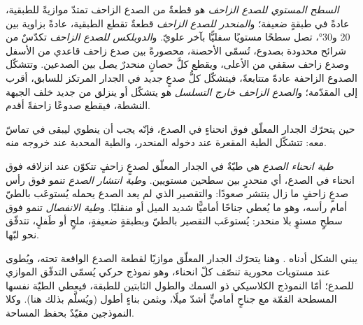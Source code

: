 \begin{definition}\label{def:b3:orogenic-wedges:thrust-geometry}
\emph{السطح المستوي للصدع الزاحف} هو قطعةٌ من الصدع الزاحف تمتدّ
موازيةً للطبقية، عادةً في طبقةٍ ضعيفة؛ و\emph{المنحدر
للصدع الزاحف} قطعةٌ تقطع الطبقية،
عادةً بزاوية بين 20 و\ang{30}، تصل سطحًا مستويًا سفليًّا بآخر علويّ.
و\emph{الدوبلكس للصدع الزاحف} تكدّسٌ من شرائح محدودة بصدوع،
تُسمّى الأحصنة، محصورةً بين صدع زاحف قاعدي من الأسفل وصدع زاحف سقفي
من الأعلى، ويقطع كلَّ حصانٍ منحدرٌ يصل بين الصدعين. وتتشكّل الصدوع الزاحفة عادةً
متتابعةً، فيتشكّل كلُّ صدعٍ جديد في الجدار المرتكز للسابق، أقرب إلى
المقدّمة؛ و\emph{الصدع الزاحف خارج التسلسل} هو
يتشكّل أو ينزلق من جديد خلف الجبهة النشطة، فيقطع صدوعًا زاحفةً أقدم.
\end{definition}

حين يتحرّك الجدار المعلّق فوق انحناءٍ في الصدع، فإنّه يجب أن ينطوي ليبقى في
تماسّ معه: تتشكّل الطية المقعرة عند دخوله المنحدر، والطية المحدبة
عند خروجه منه.

\begin{definition}\label{def:b3:orogenic-wedges:thrust-folds}
\emph{طية انحناء الصدع} هي طيّةٌ في الجدار المعلّق
لصدعٍ زاحفٍ تتكوّن عند انزلاقه فوق انحناء في الصدع، أي منحدرٍ بين
سطحين مستويين. و\emph{طية انتشار الصدع}
تنمو فوق رأس صدعٍ زاحفٍ ما زال ينتشر صعودًا: والتقصير الذي لم يعد الصدع
يحمله يُستوعَب بالطيّ أمام رأسه، وهو ما يُعطي جناحًا أماميًّا
شديد الميل أو منقلبًا. و\emph{طية
الانفصال} تنمو فوق سطحٍ مستوٍ بلا منحدر: يُستوعَب التقصير
بالطيّ وبطبقةٍ ضعيفةٍ، ملحٍ أو طَفلٍ، تتدفّق نحو
لبّها.
\end{definition}

يبني الشكل أدناه . وهنا يتحرّك الجدار المعلّق
موازيًا لقطعة الصدع الواقعة تحته، ويُطوى عند مستويات محورية تنصّف كلّ
انحناء، وهو نموذج حركي يُسمّى التدفّق الموازي للصدع؛ أمّا النموذج الكلاسيكي
ذو السمك والطول الثابتين للطبقة، فيعطي الطيّة نفسها المسطحة القمّة
مع جناحٍ أماميٍّ أشدّ ميلًا، وبثمن بناءٍ أطول (ويُسلَّم بذلك هنا).
وكلا النموذجين مقيّدٌ بحفظ المساحة.

